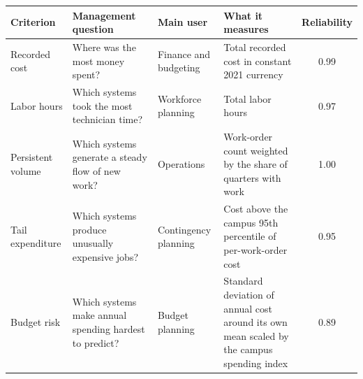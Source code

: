 \begin{tabular}{p{2.1cm}p{3.9cm}p{2.3cm}p{4.3cm}c}
\toprule
Criterion & Management question & Main user & What it measures & Reliability \\
\midrule
Recorded cost & Where was the most money spent? & Finance and budgeting & Total recorded cost in constant 2021 currency & 0.99 \\
Labor hours & Which systems took the most technician time? & Workforce planning & Total labor hours & 0.97 \\
Persistent volume & Which systems generate a steady flow of new work? & Operations & Work-order count weighted by the share of quarters with work & 1.00 \\
Tail expenditure & Which systems produce unusually expensive jobs? & Contingency planning & Cost above the campus 95th percentile of per-work-order cost & 0.95 \\
Budget risk & Which systems make annual spending hardest to predict? & Budget planning & Standard deviation of annual cost around its own mean scaled by the campus spending index & 0.89 \\
\bottomrule
\end{tabular}
